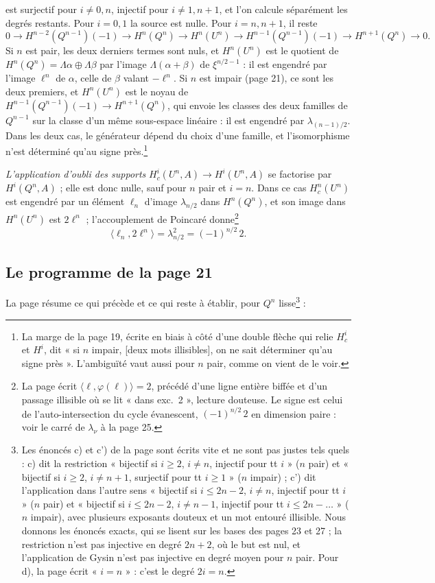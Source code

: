\documentclass[11pt,a4paper]{article}
\begin{document}
est surjectif pour $i \neq 0, n$, injectif pour $i \neq 1, n + 1$, et l'on
calcule séparément les degrés restants. Pour $i = 0, 1$ la source est nulle.
Pour $i = n, n + 1$, il reste
\[
  0 \to H^{n-2}(Q^{n-1})(-1) \to H^{n}(Q^{n}) \to H^{n}(U^{n}) \to
  H^{n-1}(Q^{n-1})(-1) \to H^{n+1}(Q^{n}) \to 0 .
\]
Si $n$ est pair, les deux derniers termes sont nuls, et $H^{n}(U^{n})$ est
le quotient de $H^{n}(Q^{n}) = \Lambda\alpha \oplus \Lambda\beta$ par
l'image $\Lambda(\alpha + \beta)$ de $\xi^{n/2-1}$ : il est engendré par
l'image $\ell^{n}$ de $\alpha$, celle de $\beta$ valant $-\ell^{n}$. Si $n$ est
impair (page 21), ce sont les deux premiers, et $H^{n}(U^{n})$ est le noyau
de $H^{n-1}(Q^{n-1})(-1) \to H^{n+1}(Q^{n})$, qui envoie les classes des deux
familles de $Q^{n-1}$ sur la classe d'un même sous-espace linéaire : il est
engendré par $\lambda_{(n-1)/2}$. Dans les deux cas, le générateur dépend du
choix d'une famille, et l'isomorphisme n'est déterminé qu'au signe
près.\footnote{La marge de la page 19, écrite en biais à côté d'une double
flèche qui relie $H^{i}_{c}$ et $H^{i}$, dit « si $n$ impair, [deux mots
illisibles], on ne sait déterminer qu'au signe près ». L'ambiguïté vaut
aussi pour $n$ pair, comme on vient de le voir.}

\emph{L'application d'oubli des supports}
$H^{i}_{c}(U^{n}, A) \to H^{i}(U^{n}, A)$ se factorise par
$H^{i}(Q^{n}, A)$ ; elle est donc nulle, sauf pour $n$ pair et $i = n$.
Dans ce cas $H^{n}_{c}(U^{n})$ est engendré par un élément $\ell_{n}$
d'image $\lambda_{n/2}$ dans $H^{n}(Q^{n})$, et son image dans
$H^{n}(U^{n})$ est $2\ell^{n}$ ; l'accouplement de Poincaré donne\footnote{La page écrit $\langle \ell, \varphi(\ell) \rangle = 2$, précédé
d'une ligne entière biffée et d'un passage illisible où se lit
« dans exc.~2 », lecture douteuse. Le signe est celui de l'auto-intersection
du cycle évanescent, $(-1)^{n/2}\,2$ en dimension paire : voir le carré de
$\lambda_{\nu}$ à la page 25.}
\[
  \langle \ell_{n}, 2\ell^{n} \rangle = \lambda_{n/2}^{2} = (-1)^{n/2}\, 2 .
\]

\subsection*{Le programme de la page 21}

La page résume ce qui précède et ce qui reste à établir, pour $Q^{n}$
lisse\footnote{Les énoncés c) et c') de la page sont écrits vite et ne sont pas
justes tels quels : c) dit la restriction « bijectif si $i \geq 2$,
$i \neq n$, injectif pour tt $i$ » ($n$ pair) et « bijectif si
$i \geq 2$, $i \neq n + 1$, surjectif pour tt $i \geq 1$ » ($n$ impair) ;
c') dit l'application dans l'autre sens « bijectif si $i \leq 2n - 2$,
$i \neq n$, injectif pour tt $i$ » ($n$ pair) et « bijectif si
$i \leq 2n - 2$, $i \neq n - 1$, injectif pour tt $i \leq 2n - \ldots$ »
($n$ impair), avec plusieurs exposants douteux et un mot entouré illisible.
Nous donnons les énoncés exacts, qui se lisent sur les bases des pages 23
et 27 ; la restriction n'est pas injective en degré $2n + 2$, où le but est
nul, et l'application de Gysin n'est pas injective en degré moyen pour $n$
pair. Pour d), la page écrit « $i = n$ » : c'est le degré $2i = n$.} :
\end{document}
